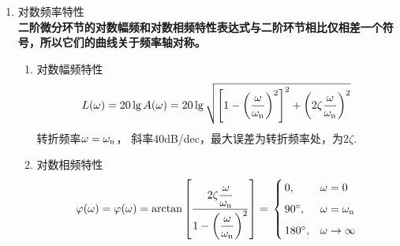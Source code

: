 \begin{enumerate}[1.]
\begin{enumerate}[(1) ]
	\end{enumerate}
	\item 对数频率特性\\
	\textbf{二阶微分环节的对数幅频和对数相频特性表达式与二阶环节相比仅相差一个符号，所以它们的曲线关于频率轴对称。}
	\begin{enumerate}[(1) ]
		\item 对数幅频特性
		\vspace*{-0.5em}
		\begin{equation}
			L(\omega)  = 20\lg A(\omega) = 20 \lg \sqrt{\left[1 - \left(\dfrac{\omega}{\omega_{\rm{n}}}\right)^2\right]^2 + \left(2 \zeta \dfrac{\omega}{\omega_{\rm{n}}}\right)^2}\\[0.5em]
		\end{equation}
		转折频率$\omega = \omega_{\rm{n}}$， 斜率40dB/dec，最大误差为转折频率处，为$2\zeta$.
		\item 对数相频特性
		\vspace*{-0.5em}
		\begin{align}
			\varphi(\omega) = \varphi(\omega) = \arctan \left[\dfrac{2 \zeta \dfrac{\omega}{\omega_{\rm{n}}}}{1 - \left(\dfrac{\omega}{\omega_{\rm{n}}}\right)^2}\right] = \,
			\begin{cases}
				\, 0, & \omega = 0\\[0.5em]
				\, 90{}^{\circ} , & \omega = \omega_{\rm{n}}\\[0.5em]
				\, 180 {}^{\circ}, & \omega \to \infty
			\end{cases}
		\end{align}
		\vspace*{-3em}
	\end{enumerate}
\end{enumerate}

